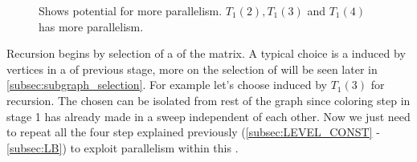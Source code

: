      \begin{figure}[thbp]
     	\centering
     	\hspace{1.5em}
     	\hspace{1.5em}
        \caption{Shows potential for more parallelism. $T_1(2),T_1(3)$ and $T_1(4)$ has more parallelism.}
     	\label{fig:rec_d1_s1}
     \end{figure}
     
     Recursion begins by selection of a \subgraph of the matrix. A typical choice is a \subgraph induced by vertices in a \levelGroup of previous stage, more on the selection of \subgraph will be seen later in \cref{subsec:subgraph_selection}. For example let's choose \subgraph induced by $T_1(3)$ for recursion. The chosen \subgraph can be isolated from rest of the graph since  \DONE coloring step in stage 1 has already made \levelGroups in a sweep independent of each other. Now we just need to repeat all the four step explained previously (\cref{subsec:LEVEL_CONST} - \cref{subsec:LB}) to exploit parallelism within this \subgraph.
   
